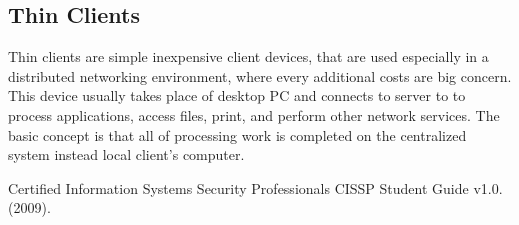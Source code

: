 \documentclass[twoside]{article}
\begin{document}
\begin{multicols}{2}
\section{Thin Clients}
Thin clients are simple inexpensive client devices, that are used especially in a distributed networking environment, where every additional costs are big concern. This device usually takes place of desktop PC and connects to server to to process applications, access files,
print, and perform other network services. The basic concept is that all of processing work is completed on the centralized system instead local client's computer.



\begin{thebibliography}{99} %

\bibitem[CISSP, 2006]{}
\newblock Certified Information Systems Security Professionals CISSP Student Guide v1.0. (2009).


 
\end{thebibliography}


\end{multicols}
\end{document}
